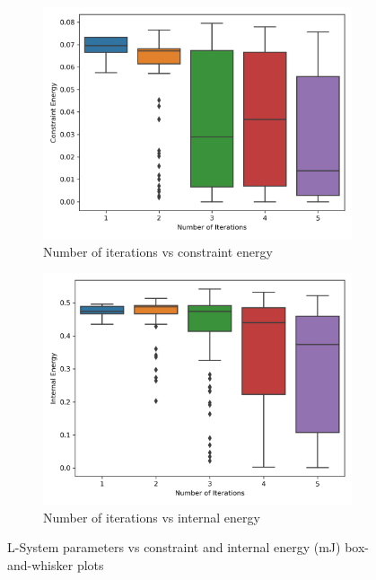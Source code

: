 \begin{figure}[H]
\begin{subfigure}[t]{0.45\textwidth}
		\includegraphics[width=\textwidth]{noi_vs_ce.png}
		\caption{Number of iterations vs constraint energy}
	\end{subfigure}
	\hfill
	\begin{subfigure}[t]{0.45\textwidth}
		\centering
		\includegraphics[width=\textwidth]{noi_vs_ie.png}
		\caption{Number of iterations vs internal energy}
	\end{subfigure}
	\caption[L-System parameters vs system energies]{L-System parameters vs constraint and internal energy (\si{mJ}) box-and-whisker plots}
	\label{fig:ls_v_e}
\end{figure}

